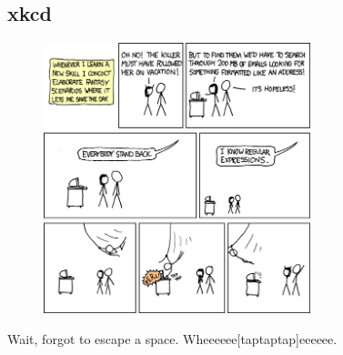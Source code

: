 \documentclass{beamer}
\begin{document}
\subsection{xkcd}
\begin{frame}[plain]
  \begin{figure}
    \begin{center}
      \includegraphics[width=220pt]{regular_expressions.png}
    \end{center}
  \end{figure}
  \begin{center}
    {\tiny Wait, forgot to escape a space.  Wheeeeee[taptaptap]eeeeee.}
  \end{center}
\end{frame}
\end{document}
